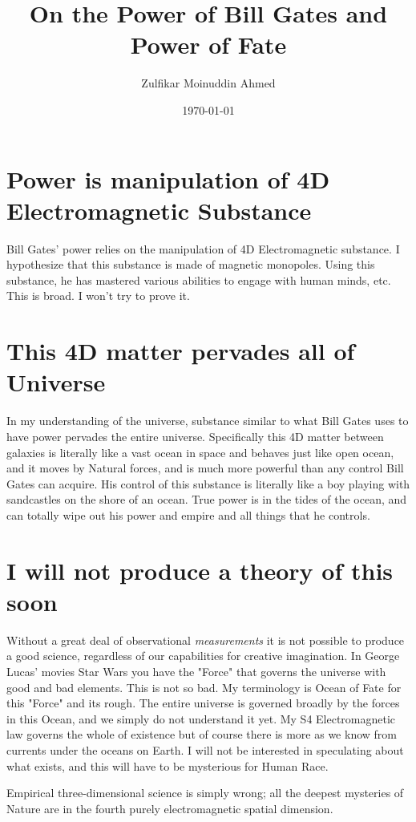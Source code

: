 \documentclass{amsart}
\title{On the Power of Bill Gates and Power of Fate}
\author{Zulfikar Moinuddin Ahmed}
\date{\today}
\begin{document}
\maketitle


\section{Power is manipulation of 4D Electromagnetic Substance}

Bill Gates' power relies on the manipulation of 4D Electromagnetic substance.  I hypothesize that this substance is made of magnetic monopoles.  Using this substance, he has mastered various abilities to engage with human minds, etc.  This is broad.  I won't try to prove it.

\section{This 4D matter pervades all of Universe}

In my understanding of the universe, substance similar to what Bill Gates uses to have power pervades the entire universe.  Specifically this 4D matter between galaxies is literally like a vast ocean in space and behaves just like open ocean, and it moves by Natural forces, and is much more powerful than any control Bill Gates can acquire.  His control of this substance is literally like a boy playing with sandcastles on the shore of an ocean.  True power is in the tides of the ocean, and can totally wipe out his power and empire and all things that he controls.

\section{I will not produce a theory of this soon}

Without a great deal of observational {\em measurements} it is not possible to produce a good science, regardless of our capabilities for creative imagination.  In George Lucas' movies Star Wars you have the "Force" that governs the universe with good and bad elements.  This is not so bad.  My terminology is Ocean of Fate for this "Force" and its rough.  The entire universe is governed broadly by the forces in this Ocean, and we simply do not understand it yet.  My S4 Electromagnetic law governs the whole of existence but of course there is more as we know from currents under the oceans on Earth.  I will not be interested in speculating about what exists, and this will have to be mysterious for Human Race.

Empirical three-dimensional science is simply wrong; all the deepest mysteries of Nature are in the fourth purely electromagnetic spatial dimension.
\end{document}
